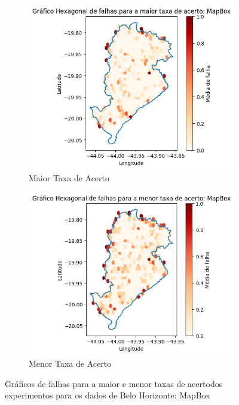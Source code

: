 \begin{figure}[ht]
  \centering
  \begin{subfigure}[b]{0.45\textwidth}
    \includegraphics[width=\textwidth]{Figuras/expFalhasMapboxmaior.png}
    \caption{Maior Taxa de Acerto}
    \label{fig:falhasmapboxBHexpMaior}
  \end{subfigure}
  \begin{subfigure}[b]{0.45\textwidth}
    \includegraphics[width=\textwidth]{Figuras/expFalhasMapboxmenor.png}
    \caption{Menor Taxa de Acerto}
    \label{fig:falhasmapboxBHexpMenor}
  \end{subfigure}
  
  \caption{Gráficos de falhas para a maior e menor taxas de acertodos experimentos para os dados de Belo Horizonte: MapBox}
  \label{fig:falhas-exp-mapbox}
\end{figure}

